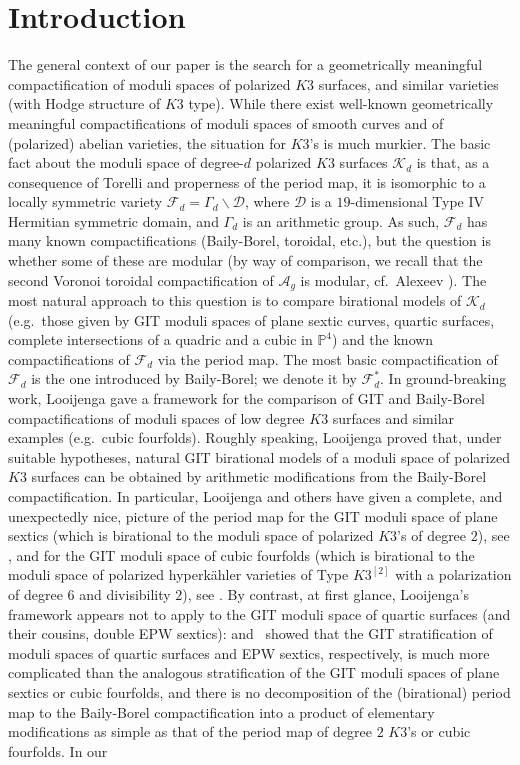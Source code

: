 \documentclass[11pt]{amsart}
\numberwithin{equation}{section}
\theoremstyle{plain}
\theoremstyle{remark}
\theoremstyle{definition}
\newcommand{\cF}{\mathscr{F}}
\newcommand{\cA}{{\mathscr A}}
\newcommand{\cD}{{\mathscr D}}
\newcommand{\cK}{{\mathscr K}}
\newcommand{\PP}{{\mathbb P}}
\begin{document}
\section{Introduction}
%
The general context of our paper is the search for a geometrically meaningful compactification of  moduli spaces of polarized $K3$ surfaces, and similar varieties (with Hodge structure of $K3$ type). While  there exist well-known geometrically meaningful compactifications of  moduli spaces of smooth curves and of (polarized) abelian varieties, the situation for $K3$'s is much murkier. The basic fact about the moduli space of degree-$d$ polarized $K3$ surfaces $\cK_d$ is that, as a consequence of Torelli and properness of the period map, it is isomorphic to a locally symmetric variety $\cF_d= \Gamma_d\backslash\cD$, where  $\cD$ is a $19$-dimensional Type IV Hermitian symmetric domain, and $\Gamma_d$ is an arithmetic group. As such, $\cF_d$ has many known compactifications (Baily-Borel, toroidal, etc.), but the  question is whether some of these are modular  (by way of comparison, we recall that  the second Voronoi toroidal compactification of  $\cA_g$ is modular, cf.~Alexeev \cite{alexeevag}). The most natural approach to this question is to compare  birational models of $\cK_d$ (e.g.~those given by GIT moduli spaces of plane sextic curves,  quartic surfaces, complete intersections of a quadric and a cubic in $\PP^4$) and the known compactifications of $\cF_d$      via the period map. 
The  most basic compactification  of $\cF_d$ is the one introduced by Baily-Borel; we   denote it by  $\cF_d^*$.   In ground-breaking work, Looijenga \cite{looijenga1,looijengacompact} gave a framework for the  comparison of GIT and Baily-Borel compactifications of moduli spaces of low degree $K3$ surfaces and  similar examples (e.g.~cubic fourfolds). Roughly speaking, Looijenga proved that, under suitable hypotheses, natural GIT birational models of a moduli space of polarized $K3$ surfaces can be obtained by arithmetic modifications from the Baily-Borel compactification. In particular, Looijenga and others have given a complete, and unexpectedly nice, picture of the period map  for the GIT moduli space of plane sextics (which is birational to the moduli space of polarized $K3$'s of degree $2$), 
 see \cite{shah,looijengavancouver,friedmanannals}, and for the GIT moduli space of cubic fourfolds (which is birational to the moduli space of polarized hyperk\"ahler varieties of Type $K3^{[2]}$ with a polarization of degree $6$ and divisibility $2$), see \cite{lcubic,gitcubic,cubic4fold}. By contrast,  at  first glance,  Looijenga's framework appears not to apply to the GIT moduli space of quartic surfaces (and their cousins, double EPW sextics): \cite{shah4} and~\cite{epw} showed that the GIT stratification of moduli spaces of quartic surfaces and EPW sextics, respectively,  is  much more complicated than the analogous stratification of the GIT moduli spaces of plane sextics or cubic fourfolds, and there is no  decomposition of the (birational) period map to the Baily-Borel compactification into a product of elementary modifications  as simple as that of the period map of degree $2$ $K3$'s or cubic fourfolds. In our 
\end{document}

